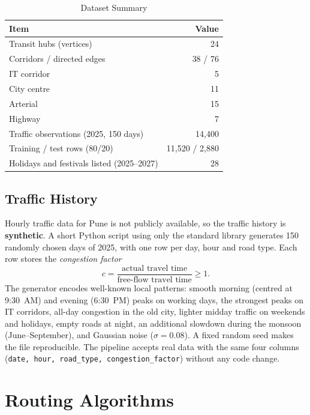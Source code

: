 \documentclass[conference]{IEEEtran}
\begin{document}
\begin{table}[t]
\caption{Dataset Summary}
\label{tab:data}
\centering
\begin{tabular}{@{}lr@{}}
\toprule
Item & Value \\
\midrule
Transit hubs (vertices) & 24 \\
Corridors / directed edges & 38 / 76 \\
\quad IT corridor & 5 \\
\quad City centre & 11 \\
\quad Arterial & 15 \\
\quad Highway & 7 \\
Traffic observations (2025, 150 days) & 14{,}400 \\
\quad Training / test rows (80/20) & 11{,}520 / 2{,}880 \\
Holidays and festivals listed (2025--2027) & 28 \\
\bottomrule
\end{tabular}
\end{table}

\subsection{Traffic History}
Hourly traffic data for Pune is not publicly available, so the traffic
history is \textbf{synthetic}. A short Python script using only the
standard library generates 150 randomly chosen days of 2025, with one
row per day, hour and road type. Each row stores the \emph{congestion
factor}
\begin{equation}
  c = \frac{\text{actual travel time}}{\text{free-flow travel time}} \ge 1 .
\end{equation}
The generator encodes well-known local patterns: smooth morning
(centred at 9:30~AM) and evening (6:30~PM) peaks on working days, the
strongest peaks on IT corridors, all-day congestion in the old city,
lighter midday traffic on weekends and holidays, empty roads at night,
an additional slowdown during the monsoon (June--September), and
Gaussian noise ($\sigma=0.08$). A fixed random seed makes the file
reproducible. The pipeline accepts real data with the same four columns
(\texttt{date, hour, road\_type, congestion\_factor}) without any code
change.

\section{Routing Algorithms}\label{sec:algos}
\end{document}

